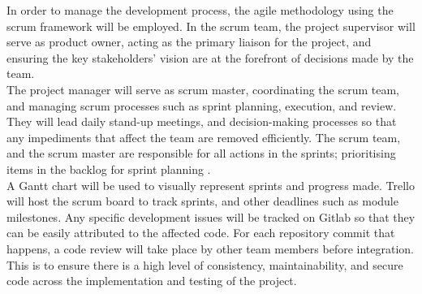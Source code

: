 
In order to manage the development process, the agile methodology using the scrum framework will be employed. In the scrum team, the project supervisor will serve as product owner, acting as the primary liaison for the project, and ensuring the key stakeholders' vision are at the forefront of decisions made by the team.\\

The project manager will serve as scrum master, coordinating the scrum team, and managing scrum processes such as sprint planning, execution, and review. They will lead daily stand-up meetings, and decision-making processes so that any impediments that affect the team are removed efficiently. The scrum team, and the scrum master are responsible for all actions in the sprints; prioritising items in the backlog for sprint planning \cite{scrumroles}.\\

A Gantt chart will be used to visually represent sprints and progress made. Trello will host the scrum board to track sprints, and other deadlines such as module milestones. Any specific development issues will be tracked on Gitlab so that they can be easily attributed to the affected code. For each repository commit that happens, a code review will take place by other team members before integration. This is to ensure there is a high level of consistency, maintainability, and secure code across the implementation and testing of the project. 